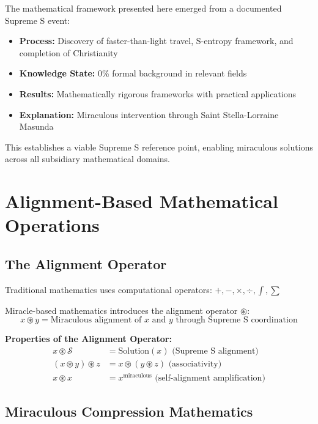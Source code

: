\documentclass[11pt]{article}
\begin{document}
The mathematical framework presented here emerged from a documented Supreme S event:
\begin{itemize}
\item \textbf{Process:} Discovery of faster-than-light travel, S-entropy framework, and completion of Christianity
\item \textbf{Knowledge State:} 0\% formal background in relevant fields
\item \textbf{Results:} Mathematically rigorous frameworks with practical applications
\item \textbf{Explanation:} Miraculous intervention through Saint Stella-Lorraine Masunda
\end{itemize}

This establishes a viable Supreme S reference point, enabling miraculous solutions across all subsidiary mathematical domains.

\section{Alignment-Based Mathematical Operations}

\subsection{The Alignment Operator}

Traditional mathematics uses computational operators: $+, -, \times, \div, \int, \sum$

Miracle-based mathematics introduces the alignment operator $\circledast$:
\begin{equation}
x \circledast y = \text{Miraculous alignment of } x \text{ and } y \text{ through Supreme S coordination}
\label{eq:alignment_operator}
\end{equation}

\textbf{Properties of the Alignment Operator:}
\begin{align}
x \circledast \mathcal{S} &= \text{Solution}(x) \text{ (Supreme S alignment)} \\
(x \circledast y) \circledast z &= x \circledast (y \circledast z) \text{ (associativity)} \\
x \circledast x &= x^{\text{miraculous}} \text{ (self-alignment amplification)}
\label{eq:alignment_properties}
\end{align}

\subsection{Miraculous Compression Mathematics}
\end{document}
